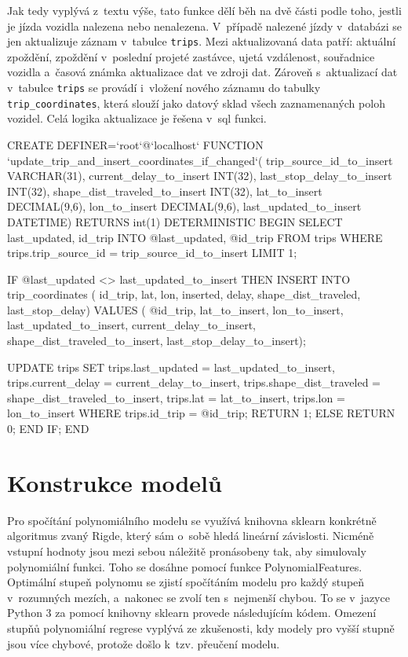 Jak tedy vyplývá z~textu výše, tato funkce dělí běh na dvě části podle toho, jestli je jízda vozidla nalezena nebo nenalezena. V~případě nalezené jízdy v~databázi se jen aktualizuje záznam v~tabulce \verb-trips-. Mezi aktualizovaná data patří: aktuální zpoždění, zpoždění v~poslední projeté zastávce, ujetá vzdálenost, souřadnice vozidla a~časová známka aktualizace dat ve zdroji dat. Zároveň s~aktualizací dat v~tabulce \verb-trips- se provádí i~vložení nového záznamu do tabulky \verb-trip_coordinates-, která slouží jako datový sklad všech zaznamenaných poloh vozidel. Celá logika aktualizace je řešena v~\gls{sql} funkci.


\begin{code}[frame=none]
CREATE DEFINER=`root`@`localhost` FUNCTION
  `update_trip_and_insert_coordinates_if_changed`(
  trip_source_id_to_insert VARCHAR(31),
  current_delay_to_insert INT(32),
    last_stop_delay_to_insert INT(32),
  shape_dist_traveled_to_insert INT(32),
  lat_to_insert DECIMAL(9,6),
  lon_to_insert DECIMAL(9,6),
  last_updated_to_insert DATETIME) RETURNS int(1)
    DETERMINISTIC
BEGIN
  SELECT last_updated, id_trip
  INTO @last_updated, @id_trip
  FROM trips
  WHERE trips.trip_source_id = trip_source_id_to_insert
  LIMIT 1;


  IF @last_updated <> last_updated_to_insert THEN
    INSERT INTO trip_coordinates (
      id_trip,
      lat,
      lon,
      inserted,
      delay,
      shape_dist_traveled,
      last_stop_delay)
    VALUES (
      @id_trip,
      lat_to_insert,
      lon_to_insert,
      last_updated_to_insert,
      current_delay_to_insert,
      shape_dist_traveled_to_insert,
      last_stop_delay_to_insert);


    UPDATE trips
    SET trips.last_updated = last_updated_to_insert,
      trips.current_delay = current_delay_to_insert,
      trips.shape_dist_traveled = shape_dist_traveled_to_insert,
      trips.lat = lat_to_insert,
      trips.lon = lon_to_insert
    WHERE trips.id_trip = @id_trip;
        RETURN 1;
  ELSE
    RETURN 0;
  END IF;
END
\end{code}




\section{Konstrukce modelů} \label{section:konstrukce_modelu}


Pro spočítání polynomiálního modelu se využívá knihovna sklearn konkrétně algoritmus zvaný Rigde, který sám o~sobě hledá lineární závislosti. Nicméně vstupní hodnoty jsou mezi sebou náležitě pronásobeny tak, aby simulovaly polynomiální funkci. Toho se dosáhne pomocí funkce PolynomialFeatures. Optimální stupeň polynomu se zjistí spočítáním modelu pro každý stupeň v~rozumných mezích, a~nakonec se zvolí ten s~nejmenší chybou. To se v~jazyce Python 3 za pomocí knihovny sklearn provede následujícím kódem. Omezení stupňů polynomiální regrese vyplývá ze zkušenosti, kdy modely pro vyšší stupně jsou více chybové, protože došlo k~tzv. přeučení modelu.


